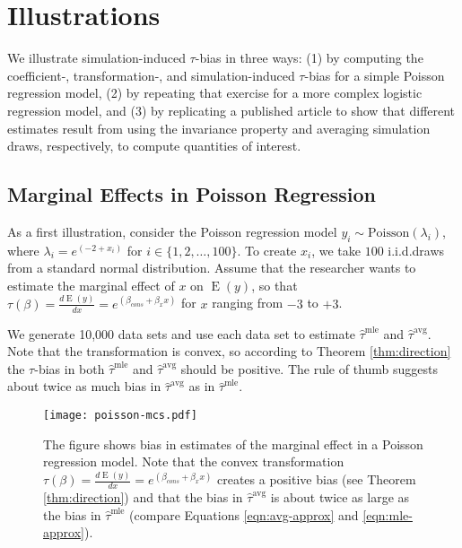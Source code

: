 \documentclass[11pt]{article}
\DeclareMathOperator*{\E}{\text{E}}
\begin{document}
\section*{Illustrations}

We illustrate simulation-induced $\tau$-bias in three ways: (1) by computing the coefficient-, transformation-, and simulation-induced $\tau$-bias for a simple Poisson regression model, (2) by repeating that exercise for a more complex logistic regression model, and (3) by replicating a published article to show that different estimates result from using the invariance property and averaging simulation draws, respectively, to compute quantities of interest.


\subsection*{Marginal Effects in Poisson Regression}

As a first illustration, consider the Poisson regression model $y_i \sim \text{Poisson}(\lambda_i)$, where $\lambda_i = e^{(-2 + x_i)}$ for $i \in \{1, 2,\ldots, 100\}$.
To create $x_i$, we take $100$ i.i.d.\@ draws from a standard normal distribution.
Assume that the researcher wants to estimate the marginal effect of $x$ on $\E(y)$, so that $\tau(\beta) = \frac{d \E (y)}{dx} = e^{(\beta_{cons} + \beta_x x)}$ for $x$ ranging from $-3$ to $+3$.

We generate 10,000 data sets and use each data set to estimate $\hat{\tau}^\text{mle}$ and $\hat{\tau}^\text{avg}$.
Note that the transformation is convex, so according to Theorem \ref{thm:direction} the $\tau$-bias in both $\hat{\tau}^\text{mle}$ and $\hat{\tau}^\text{avg}$ should be positive. The rule of thumb suggests about twice as much bias in $\hat{\tau}^\text{avg}$ as in $\hat{\tau}^\text{mle}$.

\begin{figure}[h!]
\begin{center}
\texttt{[image: poisson-mcs.pdf]}
\vspace{.1in}
\caption{The figure shows bias in estimates of the marginal effect in a Poisson regression model.
Note that the convex transformation $\tau(\beta) = \frac{d \E (y)}{dx} = e^{(\beta_{cons} + \beta_x x)}$ creates a positive bias (see Theorem \ref{thm:direction}) and that the bias in $\hat{\tau}^\text{avg}$ is about twice as large as the bias in $\hat{\tau}^\text{mle}$ (compare Equations \ref{eqn:avg-approx} and \ref{eqn:mle-approx}).}\label{fig:poisson-mcs}
\end{center}
\end{figure}
\end{document}
